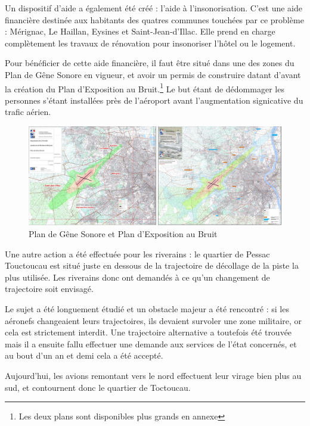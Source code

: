 Un dispositif d'aide a également été créé : l'aide à l'insonorisation.
C'est une aide financière destinée aux habitants des quatres communes touchées par ce problème : Mérignac, Le Haillan, Eysines et Saint-Jean-d'Illac. Elle prend en charge complètement les travaux de rénovation pour insonoriser l'hôtel ou le logement.

Pour bénéficier de cette aide financière, il faut être situé dans une des zones du Plan de Gêne Sonore en vigueur, et avoir un permis de construire datant d'avant la création du Plan d'Exposition au Bruit.\footnote{Les deux plans sont disponibles plus grands en annexe}
Le but étant de dédommager les personnes s'étant installées près de l'aéroport avant l'augmentation signicative du trafic aérien.

\begin{figure}[hbt!]
  \centering
  \includegraphics[width=16cm]{Images/pgs_peb.png}\newline
  \caption{Plan de Gêne Sonore et Plan d'Exposition au Bruit}
  \label{fig:pgs_peb}
\end{figure}


Une autre action a été effectuée pour les riverains : le quartier de Pessac Touctoucau est situé juste en dessous de la trajectoire de décollage de la piste la plus utilisée. Les riverains donc ont demandés à ce qu'un changement de trajectoire soit envisagé.

Le sujet a été longuement étudié et un obstacle majeur a été rencontré : si les aéronefs changeaient leurs trajectoires, ils devaient survoler une zone militaire, or cela est strictement interdit.
Une trajectoire alternative a toutefois été trouvée mais il a ensuite fallu effectuer une demande aux services de l'état concernés, et au bout d'un an et demi cela a été accepté.\newline

Aujourd'hui, les avions remontant vers le nord effectuent leur virage bien plus au sud, et contournent donc le quartier de Toctoucau.\newline

